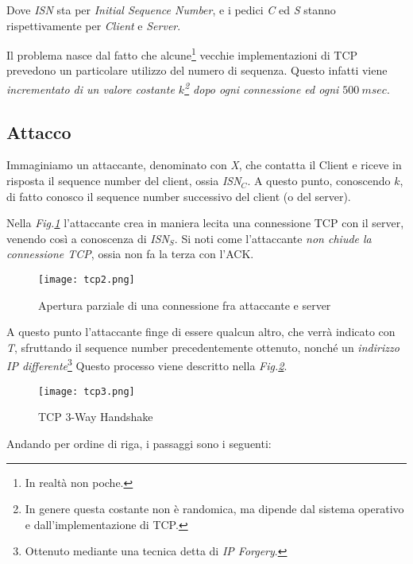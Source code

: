 \documentclass[14pt]{extreport}
\begin{document}
Dove \textit{ISN} sta per \textit{Initial Sequence Number}, e i pedici \textit{C} ed \textit{S} stanno rispettivamente per \textit{Client} e \textit{Server}. 

Il problema nasce dal fatto che alcune\footnote{In realtà non poche.} vecchie implementazioni di TCP prevedono un particolare utilizzo del numero di sequenza. Questo infatti viene \textit{incrementato di un valore costante $k$\footnote{In genere questa costante non è randomica, ma dipende dal sistema operativo e dall'implementazione di TCP.} dopo ogni connessione ed ogni $500\ msec$}.\newline


\subsection{Attacco}
Immaginiamo un attaccante, denominato con \textit{X}, che contatta il Client e riceve in risposta il sequence number del client, ossia \textit{ISN$_C$}. A questo punto, conoscendo $k$, di fatto conosco il sequence number successivo del client (o del server).

Nella \textit{Fig.\ref{tcp2}} l'attaccante crea in maniera lecita una connessione TCP con il server, venendo così a conoscenza di \textit{ISN$_S$}. Si noti come l'attaccante \textit{non chiude la connessione TCP}, ossia non fa la terza  con l'ACK.

\begin{figure}[H]
    \centering
    \texttt{[image: tcp2.png]}
    \caption{Apertura parziale di una connessione fra attaccante e server}
    \label{tcp2}
\end{figure}

A questo punto l'attaccante finge di essere qualcun altro, che verrà indicato con \textit{T}, sfruttando il sequence number precedentemente ottenuto, nonché un \textit{indirizzo IP differente}\footnote{Ottenuto mediante una tecnica detta di \textit{IP Forgery}.}
Questo processo viene descritto nella \textit{Fig.\ref{tcp3}}.

\begin{figure}[H]
    \centering
    \texttt{[image: tcp3.png]}
    \caption{TCP 3-Way Handshake}
    \label{tcp3}
\end{figure}

Andando per ordine di riga, i passaggi sono i seguenti:
\end{document}
